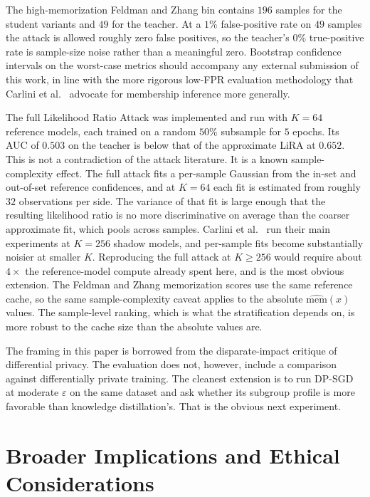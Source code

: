 \documentclass[conference]{IEEEtran}
\begin{document}
The high-memorization Feldman and Zhang bin contains $196$ samples for the student variants and $49$ for the teacher. At a $1\%$ false-positive rate on $49$ samples the attack is allowed roughly zero false positives, so the teacher's $0\%$ true-positive rate is sample-size noise rather than a meaningful zero. Bootstrap confidence intervals on the worst-case metrics should accompany any external submission of this work, in line with the more rigorous low-FPR evaluation methodology that Carlini et al.~\cite{carlini2022} advocate for membership inference more generally.

The full Likelihood Ratio Attack was implemented and run with $K = 64$ reference models, each trained on a random $50\%$ subsample for $5$ epochs. Its AUC of $0.503$ on the teacher is below that of the approximate LiRA at $0.652$. This is not a contradiction of the attack literature. It is a known sample-complexity effect. The full attack fits a per-sample Gaussian from the in-set and out-of-set reference confidences, and at $K = 64$ each fit is estimated from roughly $32$ observations per side. The variance of that fit is large enough that the resulting likelihood ratio is no more discriminative on average than the coarser approximate fit, which pools across samples. Carlini et al.~\cite{carlini2022} run their main experiments at $K = 256$ shadow models, and per-sample fits become substantially noisier at smaller $K$. Reproducing the full attack at $K \geq 256$ would require about $4\times$ the reference-model compute already spent here, and is the most obvious extension. The Feldman and Zhang memorization scores use the same reference cache, so the same sample-complexity caveat applies to the absolute $\widehat{\mathrm{mem}}(x)$ values. The sample-level ranking, which is what the stratification depends on, is more robust to the cache size than the absolute values are.

The framing in this paper is borrowed from the disparate-impact critique of differential privacy. The evaluation does not, however, include a comparison against differentially private training. The cleanest extension is to run DP-SGD at moderate $\varepsilon$ on the same dataset and ask whether its subgroup profile is more favorable than knowledge distillation's. That is the obvious next experiment.

\section*{Broader Implications and Ethical Considerations}
\end{document}
